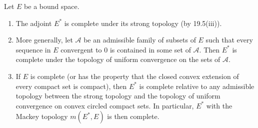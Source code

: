 Let $E$ be a bound space.
\begin{enumerate}
    \item The adjoint $E^*$ is complete under its strong topology (by 19.5(iii)).
    \item More generally, let $\mathcal{A}$ be an admissible family of subsets of $E$ such that every sequence in $E$ convergent to $0$ is contained in some set of $\mathcal{A}$. Then $E^*$ is complete under the topology of uniform convergence on the sets of $\mathcal{A}$.
    \item If $E$ is complete (or has the property that the closed convex extension of every compact set is compact), then $E^*$ is complete relative to any admissible topology between the strong topology and the topology of uniform convergence on convex circled compact sets. In particular, $E^*$ with the Mackey topology $m(E^*, E)$ is then complete.
\end{enumerate}
